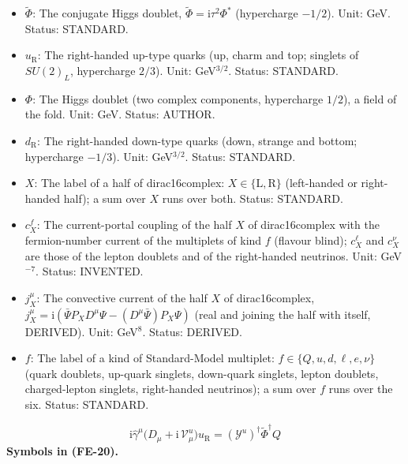 \documentclass[
  10pt,
]{article}
\begin{document}
\begin{itemize}
  The Yukawa matrices (\(3 \times 3\) complex matrices in generation
  space) of the up quarks, the down quarks, the charged leptons and the
  neutrinos. Unit: dimensionless. Status: STANDARD.
\item
  \(\tilde\Phi\): The conjugate Higgs doublet,
  \(\tilde\Phi = \mathrm{i}\tau^2\Phi^*\) (hypercharge \(-1/2\)). Unit:
  GeV. Status: STANDARD.
\item
  \(u_{\mathrm{R}}\): The right-handed up-type quarks (up, charm and
  top; singlets of \(SU(2)_L\), hypercharge \(2/3\)). Unit:
  GeV\(^{3/2}\). Status: STANDARD.
\item
  \(\Phi\): The Higgs doublet (two complex components, hypercharge
  \(1/2\)), a field of the fold. Unit: GeV. Status: AUTHOR.
\item
  \(d_{\mathrm{R}}\): The right-handed down-type quarks (down, strange
  and bottom; hypercharge \(-1/3\)). Unit: GeV\(^{3/2}\). Status:
  STANDARD.
\item
  \(X\): The label of a half of dirac16complex:
  \(X \in \{\mathrm{L}, \mathrm{R}\}\) (left-handed or right-handed
  half); a sum over \(X\) runs over both. Status: STANDARD.
\item
  \(c^{f}_X\): The current-portal coupling of the half \(X\) of
  dirac16complex with the fermion-number current of the multiplets of
  kind \(f\) (flavour blind); \(c^{\ell}_X\) and \(c^{\nu}_X\) are those
  of the lepton doublets and of the right-handed neutrinos. Unit:
  GeV\(^{-7}\). Status: INVENTED.
\item
  \(j_X^\mu\): The convective current of the half \(X\) of
  dirac16complex,
  \(j_X^\mu = \mathrm{i}(\bar\Psi P_XD^\mu\Psi - (D^\mu\bar\Psi)P_X\Psi)\)
  (real and joining the half with itself, DERIVED). Unit: GeV\(^8\).
  Status: DERIVED.
\item
  \(f\): The label of a kind of Standard-Model multiplet:
  \(f \in \{Q, u, d, \ell, e, \nu\}\) (quark doublets, up-quark
  singlets, down-quark singlets, lepton doublets, charged-lepton
  singlets, right-handed neutrinos); a sum over \(f\) runs over the six.
  Status: STANDARD.
\end{itemize}

\[
\mathrm{i}\hat\gamma^\mu\big(D_\mu + \mathrm{i}\,\mathcal{V}^{u}_\mu\big)u_{\mathrm{R}} = (\mathcal{Y}^{u})^\dagger\tilde\Phi^\dagger Q \tag{FE-20}
\] \textbf{Symbols in (FE-20).}
\end{document}
